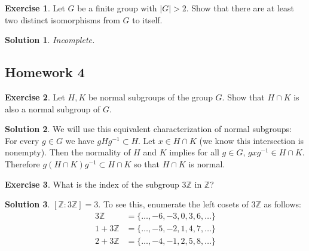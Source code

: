 \documentclass[12pt]{article}
\theoremstyle{definition}
\newtheorem{exercise}{Exercise}
\theoremstyle{definition}
\newtheorem{solution}{Solution}
\newcommand{\Z}{\mathbb{Z}}
\begin{document}
\begin{exercise}
Let $G$ be a finite group with $|G| > 2$. Show that there are at least two distinct isomorphisms from $G$ to itself. 
\end{exercise}
\begin{solution}
\it Incomplete.
\end{solution}

\subsection{Homework 4}

\begin{exercise}
Let $H, K$ be normal subgroups of the group $G$. Show that $H \cap K$ is also a normal subgroup of $G$.
\end{exercise}
\begin{solution}
We will use this equivalent characterization of normal subgroups: For every $g \in G$ we have $gHg^{-1} \subset H$. Let $x \in H \cap K$ (we know this intersection is nonempty). Then the normality of $H$ and $K$ implies for all $g \in G$, $gxg^{-1} \in H \cap K$. Therefore $g (H \cap K) g^{-1} \subset H \cap K$ so that $H \cap K$ is normal.
\end{solution}

\begin{exercise}
What is the index of the subgroup $3 \Z$ in $\Z$?
\end{exercise}
\begin{solution}
$[\Z : 3 \Z] = 3$. To see this, enumerate the left cosets of $3\Z$ as follows:
\begin{align*}
3 \Z &= \{ \ldots, -6, -3, 0, 3, 6, \ldots \} \\
1 + 3 \Z &= \{ \ldots, -5, -2, 1, 4, 7, \ldots \} \\
2 + 3 \Z &= \{ \ldots, -4, -1, 2, 5, 8, \ldots \}
\end{align*}
\end{solution}
\end{document}
